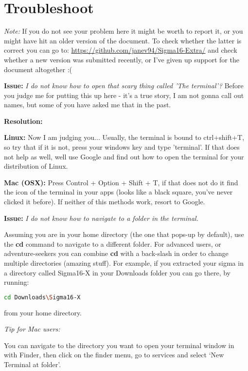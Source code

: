\documentclass[11pt,a4paper]{article}
\begin{document}
\section{Troubleshoot}

\textit{Note:} If you do not see your problem here it might be worth to report it, or you might have hit an older version of the document. To check whether the latter is correct you can go to: \url{https://github.com/janev94/Sigma16-Extra/}
and check whether a new version was submitted recently, or I've given up support for the document altogether :(



\textbf{Issue:} \textit{I do not know how to open that scary thing called 'The terminal'?} Before you judge me for putting this up here - it's a true story, I am not gonna call out names, but some of you have asked me that in the past.

\textbf{Resolution:}

\textbf{Linux:}
Now I am judging you... Usually, the terminal is bound to ctrl+shift+T, so try that if it is not, press your windows key and type 'terminal'. If that does not help as well, well use Google and find out how to open the terminal for your distribution of Linux.

\textbf{Mac (OSX):}
Press Control + Option + Shift + T, if that does not do it find the icon of the terminal in your apps (looks like a black square, you've never clicked it before). If neither of this methods work, resort to Google.


\textbf{Issue:} \textit{I do not know how to navigate to a folder in the terminal.}

Assuming you are in your home directory (the one that pops-up by default), use the \textbf{cd} command to navigate to a different folder. For advanced users, or adventure-seekers you can combine \textbf{cd} with a back-slash in order to change multiple directories (amazing stuff). For example, if you extracted your sigma in a directory called Sigma16-X in your Downloads folder you can go there, by running:

\begin{lstlisting}[language=Bash]
cd Downloads\Sigma16-X
\end{lstlisting}
from your home directory.

\textit{Tip for Mac users:}

You can navigate to the directory you want to open your terminal window in with Finder, then click on the finder menu, go to services and select `New Terminal at folder'.
\end{document}
